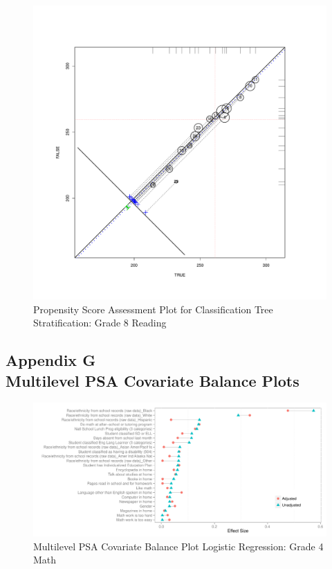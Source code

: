\documentclass[letterpaper,12p,twoside]{article} %
\begin{document}
\clearpage
\begin{figure}
\begin{center}
\includegraphics[height=.4\textheight,width=.4\textheight]{../Figures2009/g8read-circpsa-tree.pdf}
\caption{Propensity Score Assessment Plot for Classification Tree Stratification: Grade 8 Reading}
\end{center}
\end{figure}





\clearpage
{}
\subsection*{Appendix G\\Multilevel PSA Covariate Balance Plots}

\begin{figure}[h!]
\begin{center}
\includegraphics[width=\textwidth]{../Figures2009/g4math-mlpsa-lr-balance.pdf}
\caption{Multilevel PSA Covariate Balance Plot Logistic Regression: Grade 4 Math}
\end{center}
\end{figure}
\end{document}
